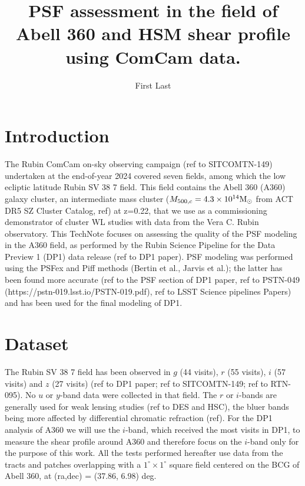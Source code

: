 \documentclass[SE,lsstdraft,authoryear,toc]{lsstdoc}
\title{PSF assessment in the field of Abell 360 and HSM shear profile using ComCam data.}
\author{%
First Last
}
\date{\vcsDate}
\begin{document}
\maketitle


\section{Introduction}
The Rubin ComCam on-sky observing campaign (ref to SITCOMTN-149) undertaken at the end-of-year 2024 covered seven fields, among which the low ecliptic latitude Rubin SV 38 7 field. This field contains the Abell 360 (A360) galaxy cluster, an intermediate mass cluster ($M_{500,c} = 4.3\times 10^{14} \rm{M}_\odot$ from ACT DR5 SZ Cluster Catalog, ref) at z=0.22, that we use as a commissioning demonstrator of cluster WL studies with data from the Vera C. Rubin observatory. This TechNote focuses on assessing the quality of the PSF modeling in the A360 field, as performed by the Rubin Science Pipeline for the Data Preview 1 (DP1) data release (ref to DP1 paper). PSF modeling was performed using the PSFex and Piff methods (Bertin et al., Jarvis et al.); the latter has been found more accurate (ref to the PSF section of DP1 paper, ref to PSTN-049 (https://pstn-019.lsst.io/PSTN-019.pdf), ref to LSST Science pipelines Papers) and has been used for the final modeling of DP1.

\section{Dataset}
The Rubin SV 38 7 field has been observed in $g$ (44 visits), $r$ (55 visits), $i$ (57 visits) and $z$ (27 visits) (ref to DP1 paper; ref to SITCOMTN-149; ref to RTN-095). No $u$ or $y$-band data were collected in that field. The $r$ or $i$-bands are generally used for weak lensing studies (ref to DES and HSC), the bluer bands being more affected by differential chromatic refraction (ref). For the DP1 analysis of A360 we will use the $i$-band, which received the most visits in DP1, to measure the shear profile around A360 and therefore focus on the $i$-band only for the purpose of this work. All the tests performed hereafter use data from the tracts and patches overlapping with  a $1^\circ \times 1^\circ$ square field centered on the BCG of Abell 360, at (ra,dec) = (37.86, 6.98) deg. 
\end{document}
